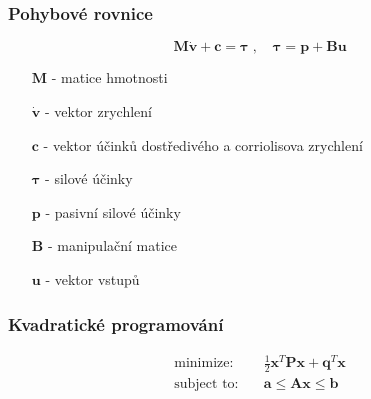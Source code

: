 \begin{frame}
	\frametitle{Pohybové rovnice}
	
	\begin{equation*}
		\bm{M} \bm{\dot{v}} + \bm{c} = \bm{\tau}
		\;,\quad \bm{\tau} = \bm{p} + \bm{B}\bm{u}
	\end{equation*}
	\begin{itemize}
		\item [$\bm{M}$] - matice hmotnosti
		\item [$\bm{\dot{v}}$] - vektor zrychlení
		\item [$\bm{c}$] - vektor účinků dostředivého a corriolisova zrychlení
		\item [$\bm{\tau}$] - silové účinky
		\item [$\bm{p}$] - pasivní silové účinky
		\item [$\bm{B}$] - manipulační matice
		\item [$\bm{u}$] - vektor vstupů
	\end{itemize}
\end{frame}

\begin{frame}
	\frametitle{Kvadratické programování}
	\begin{align*}
		\text{minimize:}& \quad \frac{1}{2}\bm{x}^T\!\bm{P}\bm{x} + \bm{q}^T\!\bm{x} \\ 
		\text{subject to:}& \quad \bm{a} \leq \bm{A}\bm{x} \leq \bm{b}
	\end{align*}
\end{frame}